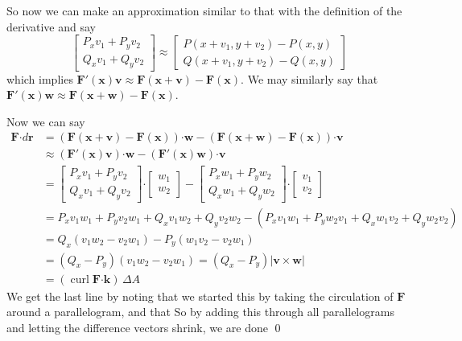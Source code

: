 \documentclass[letterpaper, 11pt, openany]{book}
\newcommand{\scdot}{\boldsymbol{\cdot}}
\newcommand{\curl}[1]{\operatorname{curl}\mathbf{#1}}
\theoremstyle{mytheoremstyle}
\renewenvironment{proof}{{\par \sffamily \smaller \fontseries{b}\selectfont Proof}}{\hfill\qed}
\theoremstyle{myexamplestyle}
\begin{document}
\begin{proof}
    So now we can make an approximation similar to that with the definition of the derivative and say
    \[\begin{bmatrix}
        P_{x}v_{1} + P_{y}v_{2}\\
        Q_{x}v_{1} + Q_{y}v_{2}
    \end{bmatrix} \approx
    \begin{bmatrix}
        P(x + v_{1}, y + v_{2}) - P(x,y)\\
        Q(x + v_{1}, y + v_{2}) - Q(x,y)
    \end{bmatrix}\] which implies \(\mathbf{F}'(\mathbf{x}) \mathbf{v} \approx \mathbf{F}(\mathbf{x} + \mathbf{v}) - \mathbf{F}(\mathbf{x})\). We may similarly say that \(\mathbf{F}'(\mathbf{x}) \mathbf{w} \approx \mathbf{F}(\mathbf{x} + \mathbf{w}) - \mathbf{F}(\mathbf{x})\).

    Now we can say
    \begin{align*}
        \mathbf{F}\scdot d\mathbf{r}  &=(\mathbf{F}(\mathbf{x} + \mathbf{v}) - \mathbf{F}(\mathbf{x}))\scdot \mathbf{w} - (\mathbf{F}(\mathbf{x} + \mathbf{w}) - \mathbf{F}(\mathbf{x}))\scdot \mathbf{v} \\
        &\approx (\mathbf{F}'(\mathbf{x}) \mathbf{v})\scdot \mathbf{w} - (\mathbf{F}'(\mathbf{x}) \mathbf{w})\scdot \mathbf{v}\\
        &= \begin{bmatrix}
        P_{x}v_{1} + P_{y}v_{2}\\
        Q_{x}v_{1} + Q_{y}v_{2}
    \end{bmatrix} \scdot
    \begin{bmatrix}
        w_{1}\\
        w_{2}
    \end{bmatrix} -
    \begin{bmatrix}
        P_{x}w_{1} + P_{y}w_{2}\\
        Q_{x}w_{1} + Q_{y}w_{2}
    \end{bmatrix} \scdot
    \begin{bmatrix}
        v_{1}\\
        v_{2}
    \end{bmatrix}\\
    &= P_{x}v_{1}w_{1} + P_{y}v_{2}w_{1} + Q_{x}v_{1}w_{2} + Q_{y}v_{2}w_{2} - (P_{x}v_{1}w_{1} + P_{y}w_{2}v_{1} + Q_{x}w_{1}v_{2} + Q_{y}w_{2}v_{2})\\
    &= Q_{x}(v_{1}w_{2} - v_{2}w_{1}) - P_{y}(w_{1}v_{2} - v_{2}w_{1})\\
    &= (Q_{x} - P_{y})(v_{1}w_{2} - v_{2}w_{1}) = (Q_{x} - P_{y}) |\mathbf{v} \times \mathbf{w}|\\
    &= (\curl{F}\scdot \mathbf{k}) \, \Delta A
    \end{align*}
    We get the last line by noting that we started this by taking the circulation of \(\mathbf{F}\) around a parallelogram, and that  So by adding this through all parallelograms and letting the difference vectors shrink, we are done \faSmile
\end{proof}
\end{document}
